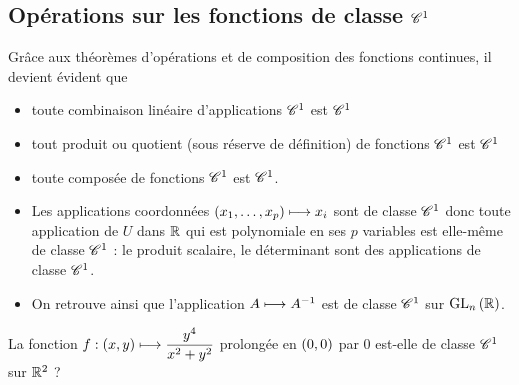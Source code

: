 \subsection{Opérations sur les fonctions de classe \(\mathscr{C}^{1}\)}

Grâce aux théorèmes d'opérations et de composition des fonctions continues, il devient évident que

\begin{itemize}
    \item toute combinaison linéaire d'applications \(\mathscr{C}^{1}\) est \(\mathscr{C}^{1}\) \\
    \item tout produit ou quotient (sous réserve de définition) de fonctions \(\mathscr{C}^{1}\) est \(\mathscr{C}^{1}\) \\
    \item toute composée de fonctions \(\mathscr{C}^{1}\) est \(\mathscr{C}^{1}\).
\end{itemize}

\begin{ex}
\begin{itemize}
    \item Les applications coordonnées \(\left(x_1,\dots,x_p\right)\longmapsto x_i\) sont de classe \(\mathscr{C}^{1}\) donc toute application de \(U\) dans \(\mathbb{R}\) qui est polynomiale en ses \(p\) variables est elle-même de classe \(\mathscr{C}^{1}\) : le produit scalaire, le déterminant sont des applications de classe \(\mathscr{C}^{1}\). \\
    \item On retrouve ainsi que l'application \(A\longmapsto A^{-1}\) est de classe \(\mathscr{C}^{1}\) sur \(\GL{n}[\R]\).
\end{itemize}
\end{ex}

\begin{exo}
La fonction \(f:\left(x,y\right)\longmapsto\dfrac{y^4}{x^2+y^2}\) prolongée en \(\left(0,0\right)\) par \(0\) est-elle de classe \(\mathscr{C}^{1}\) sur \(\mathbb{R}^2\) ?
\end{exo}

